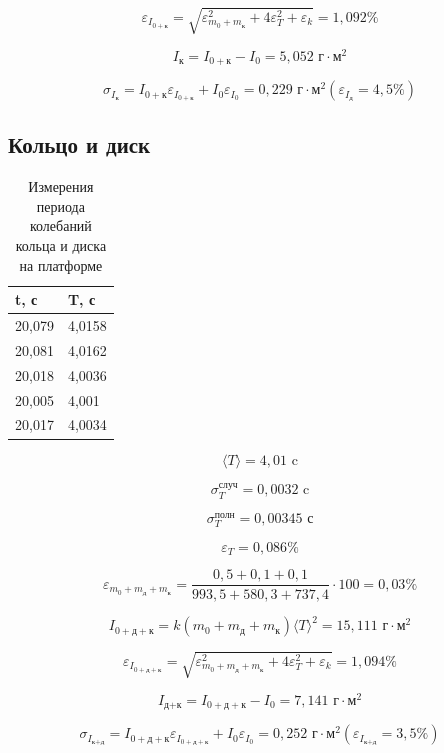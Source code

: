 \documentclass[a4paper, 12pt]{article}
\begin{document}
\[ \varepsilon_{I_{0+\text{к}}} = \sqrt{\varepsilon_{m_0+m_\text{к}}^2 + 4\varepsilon_T^2 + \varepsilon_k} = 1,092\%\]

\[ I_\text{к} = I_{0+\text{к}} - I_0 = 5,052 \text{ г}\cdot\text{м}^2\]

\[ \sigma_{I_\text{к}} = I_{0+\text{к}}\varepsilon_{I_{0+\text{к}}} + I_0\varepsilon_{I_0} = 0,229 \text{ г}\cdot\text{м}^2 (\varepsilon_{I_\text{д}} = 4,5\%) \]

\subsection*{Кольцо и диск}

\begin{table}
    \centering
    \begin{tabular}{|l|l|}
    \hline
        t, с & T, с \\ \hline
        20,079 & 4,0158 \\ \hline
        20,081 & 4,0162 \\ \hline
        20,018 & 4,0036 \\ \hline
        20,005 & 4,001 \\ \hline
        20,017 & 4,0034 \\ \hline
    \end{tabular}
    \caption{Измерения периода колебаний кольца и диска на платформе}
\end{table}

\[ \langle T \rangle = 4,01 \text{ c}\]

\[\sigma_T^{\text{случ}} = 0,0032 \text{ c}\]

\[\sigma_T^{\text{полн}} = 0,00345 \text{ с}\]

\[\varepsilon_T = 0,086\% \]

\[\varepsilon_{m_0+m_\text{д}+m_\text{к}} = \frac{0,5+0,1+0,1}{993,5+580,3+737,4} \cdot 100 = 0,03\%\]

\[ I_{0+\text{д}+\text{к}} = k(m_0+m_\text{д}+m_\text{к}) {\langle T \rangle}^2 = 15,111 \text{ г}\cdot\text{м}^2\]

\[ \varepsilon_{I_{0+\text{д}+\text{к}}} = \sqrt{\varepsilon_{m_0+m_\text{д}+m_\text{к}}^2 + 4\varepsilon_T^2 + \varepsilon_k} = 1,094\%\]

\[ I_{\text{д}+\text{к}} = I_{0+\text{д}+\text{к}} - I_0 = 7,141 \text{ г}\cdot\text{м}^2\]

\[ \sigma_{I_{\text{к}+\text{д}}} = I_{0+\text{д}+\text{к}}\varepsilon_{I_{0+\text{д}+\text{к}}} + I_0\varepsilon_{I_0} = 0,252 \text{ г}\cdot\text{м}^2 (\varepsilon_{I_{\text{к}+\text{д}}} = 3,5\%) \]
\end{document}
